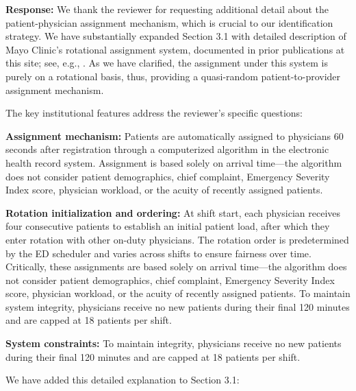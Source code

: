 \documentclass[11pt]{article}
\newcommand{\1}{\hbox{\rm 1\kern-.35em 1}}
\begin{document}
\noindent\textbf{Response:} \color{blue} We thank the reviewer for requesting additional detail about the patient-physician assignment mechanism, which is crucial to our identification strategy. We have substantially expanded Section 3.1 with detailed description of Mayo Clinic's rotational assignment system, documented in prior publications at this site; see, e.g., \cite{Traub2016, traub2016emergency, Traub2018}. As we have clarified, the assignment under this system is purely on a rotational basis, thus, providing a quasi-random patient-to-provider assignment mechanism.

The key institutional features address the reviewer's specific questions:

\textbf{Assignment mechanism:} Patients are automatically assigned to physicians 60 seconds after registration through a computerized algorithm in the electronic health record system. Assignment is based solely on arrival time—the algorithm does not consider patient demographics, chief complaint, Emergency Severity Index score, physician workload, or the acuity of recently assigned patients.

\textbf{Rotation initialization and ordering:} At shift start, each physician receives four consecutive patients to establish an initial patient load, after which they enter rotation with other on-duty physicians. The rotation order is predetermined by the ED scheduler and varies across shifts to ensure fairness over time. Critically, these assignments are based solely on arrival time---the algorithm does not consider patient demographics, chief complaint, Emergency Severity Index score, physician workload, or the acuity of recently assigned patients. To maintain system integrity, physicians receive no new patients during their final 120 minutes and are capped at 18 patients per shift.

\textbf{System constraints:} To maintain integrity, physicians receive no new patients during their final 120 minutes and are capped at 18 patients per shift.

We have added this detailed explanation to Section 3.1:
\end{document}
